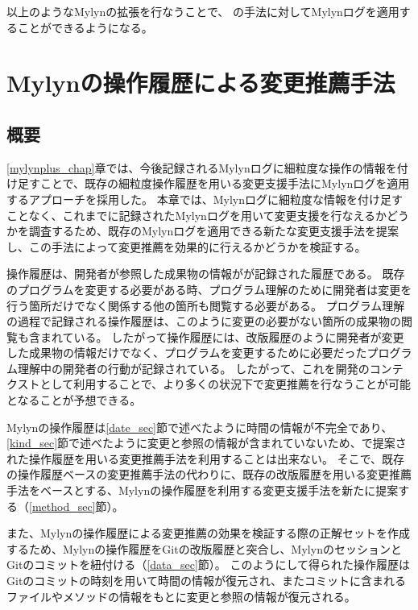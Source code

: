 \documentclass[a4paper]{jsbook}
\begin{document}
以上のようなMylynの拡張を行なうことで、
\cite{6233415,KatoJapanese:2011,ss2012-76,ss2013-84,Yamamori:2016}の手法に対してMylynログを適用することができるようになる。

\chapter{Mylynの操作履歴による変更推薦手法}\label{experiment_chap}
\section{概要}
\ref{mylynplus_chap}章では、今後記録されるMylynログに細粒度な操作の情報を付け足すことで、既存の細粒度操作履歴を用いる変更支援手法にMylynログを適用するアプローチを採用した。
本章では、Mylynログに細粒度な情報を付け足すことなく、これまでに記録されたMylynログを用いて変更支援を行なえるかどうかを調査するため、既存のMylynログを適用できる新たな変更支援手法を提案し、この手法によって変更推薦を効果的に行えるかどうかを検証する。

操作履歴は、開発者が参照した成果物の情報がが記録された履歴である。
既存のプログラムを変更する必要がある時、プログラム理解\cite{Storey:2006}のために開発者は変更を行う箇所だけでなく関係する他の箇所も閲覧する必要がある。
プログラム理解の過程で記録される操作履歴は、このように変更の必要がない箇所の成果物の閲覧も含まれている。
したがって操作履歴には、改版履歴のように開発者が変更した成果物の情報だけでなく、プログラムを変更するために必要だったプログラム理解中の開発者の行動が記録されている。
したがって、これを開発のコンテクストとして利用することで、より多くの状況下で変更推薦を行なうことが可能となることが予想できる。

Mylynの操作履歴は\ref{date_sec}節で述べたように時間の情報が不完全であり、\ref{kind_sec}節で述べたように変更と参照の情報が含まれていないため、\cite{6233415}で提案された操作履歴を用いる変更推薦手法を利用することは出来ない。
そこで、既存の操作履歴ベースの変更推薦手法の代わりに、既存の改版履歴を用いる変更推薦手法をベースとする、Mylynの操作履歴を利用する変更支援手法を新たに提案する（\ref{method_sec}節）。

また、Mylynの操作履歴による変更推薦の効果を検証する際の正解セットを作成するため、Mylynの操作履歴をGitの改版履歴と突合し、MylynのセッションとGitのコミットを紐付ける（\ref{data_sec}節）。
このようにして得られた操作履歴はGitのコミットの時刻を用いて時間の情報が復元され、またコミットに含まれるファイルやメソッドの情報をもとに変更と参照の情報が復元される。
\end{document}
